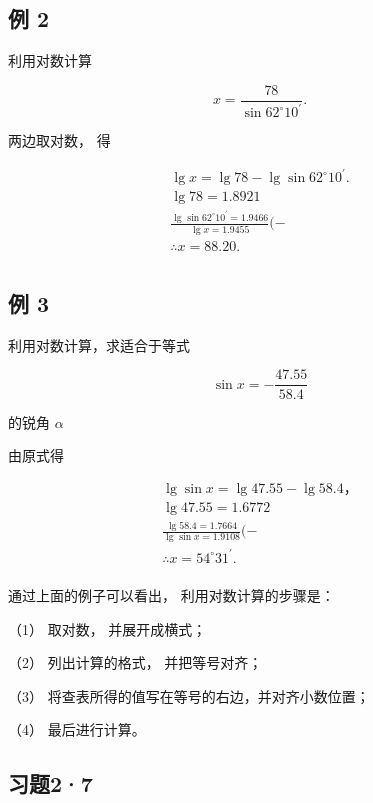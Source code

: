 \subsection{例 2}

利用对数计算

\[
x = \frac {78}{\sin 62 ^{\circ} 10 ^{\prime}}.
\]

 两边取对数， 得

\[
\begin{array}{l} \lg x = \lg 78 - \lg \sin 62 ^{\circ} 10 ^{\prime}. \\ \lg 78 = 1.8921 \\ \frac {\lg \sin 62 ^{\circ} 10 ^{\prime} = 1.9466}{\lg x = 1.9455} (- \\ \therefore x = 88.20. \\ \end{array}
\]

\subsection{例 3}

利用对数计算，求适合于等式

\[
\sin x = - \frac {47.55}{58.4}
\]

的锐角 \(\alpha\)

 由原式得

\[
\begin{array}{l} \lg \sin x = \lg 47.55 - \lg 58.4\text{，} \\ \lg 47.55 = 1.6772 \\ \frac {\lg 58.4 = 1.7664}{\lg \sin x = 1.9108} (- \\ \therefore x = 54 ^{\circ} 31 ^{\prime}. \\ \end{array}
\]

通过上面的例子可以看出， 利用对数计算的步骤是：

（1） 取对数， 并展开成横式；

（2） 列出计算的格式， 并把等号对齐；

（3） 将查表所得的值写在等号的右边，并对齐小数位置；

（4） 最后进行计算。

\subsection{习题2·7}

